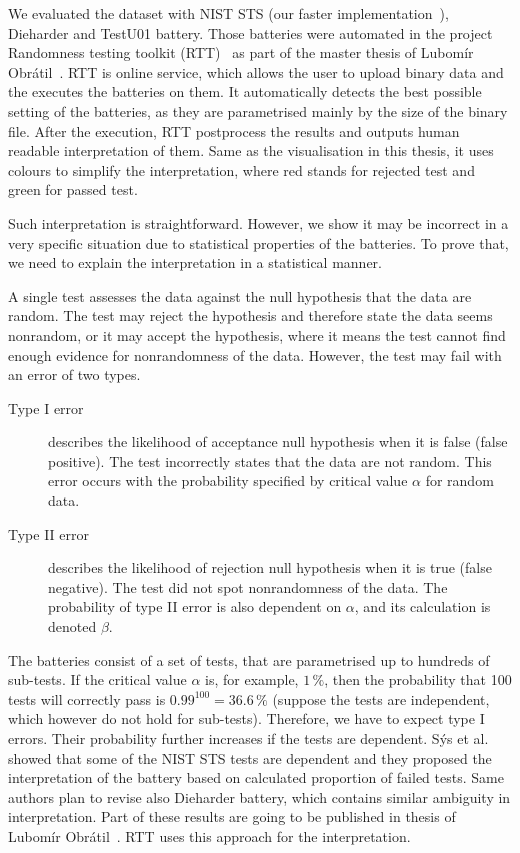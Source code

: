\documentclass[
  print, %
  Table,   %
  nolof,     %
  nolot,     %
  11pt, %
  oneside  %
]{fithesis3}
\begin{document}
We evaluated the dataset with NIST STS (our faster implementation~\cite{sys2016algorithm}), Dieharder and TestU01 battery. Those batteries were automated in the project Randomness testing toolkit (RTT)~\cite{rttgit} as part of the master thesis of Lubomír Obrátil~\cite{obratilMgrThesis}. RTT is online service, which allows the user to upload binary data and the executes the batteries on them. It automatically detects the best possible setting of the batteries, as they are parametrised mainly by the size of the binary file. After the execution, RTT postprocess the results and outputs human readable interpretation of them. Same as the visualisation in this thesis, it uses colours to simplify the interpretation, where red stands for rejected test and green for passed test.

Such interpretation is straightforward. However, we show it may be incorrect in a very specific situation due to statistical properties of the batteries. To prove that, we need to explain the interpretation in a statistical manner.

A single test assesses the data against the null hypothesis that the data are random. The test may reject the hypothesis and therefore state the data seems nonrandom, or it may accept the hypothesis, where it means the test cannot find enough evidence for nonrandomness of the data. However, the test may fail with an error of two types.

\begin{description}
    \item[Type I error] describes the likelihood of acceptance null hypothesis when it is false (false positive). The test incorrectly states that the data are not random. This error occurs with the probability specified by critical value $\alpha$ for random data.
    \item[Type II error] describes the likelihood of rejection null hypothesis when it is true (false negative). The test did not spot nonrandomness of the data. The probability of type II error is also dependent on $\alpha$, and its calculation is denoted $\beta$.
\end{description}

The batteries consist of a set of tests, that are parametrised up to hundreds of sub-tests. If the critical value $\alpha$ is, for example, $1\,\%$, then the probability that 100 tests will correctly pass is $0.99^{100}=36.6\,\%$ (suppose the tests are independent, which however do not hold for sub-tests). Therefore, we have to expect type I errors. Their probability further increases if the tests are dependent. Sýs et al.~\cite{sys2015interpretation} showed that some of the NIST STS tests are dependent and they proposed the interpretation of the battery based on calculated proportion of failed tests. Same authors plan to revise also Dieharder battery, which contains similar ambiguity in interpretation. Part of these results are going to be published in thesis of Lubomír Obrátil~\cite{obratilMgrThesis}. RTT uses this approach for the interpretation.
\end{document}
